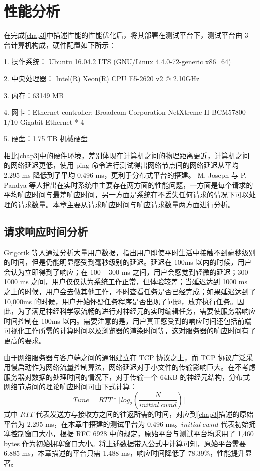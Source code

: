 \chapter{性能分析}

在完成\ref{chap3}中描述性能的性能优化后，将其部署在测试平台下，测试平台由 3 台计算机构成，硬件配置如下所示：

1. 操作系统： Ubuntu 16.04.2 LTS (GNU/Linux 4.4.0-72-generic x86\_64)

2. 中央处理器： Intel(R) Xeon(R) CPU E5-2620 v2 @ 2.10GHz

3. 内存：63149 MB

4. 网卡：Ethernet controller: Broadcom Corporation NetXtreme II BCM57800 1/10 Gigabit Ethernet * 4

5. 硬盘：1.75 TB 机械硬盘

相比\ref{chap3}中的硬件环境，差别体现在计算机之间的物理距离更近，计算机之间的网络延迟更低，使用 ping 命令进行测试得出网络节点间的网络延迟从平均 2.295 ms 降低到了平均 0.496 ms，更利于分布式平台的搭建。
M. Joseph 与 P. Pandya 等人指出在实时系统中主要存在两方面的性能问题，一方面是每个请求的平均响应时间与最差响应时间，另一方面是系统在不丢失任何请求的情况下可以处理的请求数量。本章主要从请求响应时间与响应请求数量两方面进行分析。

\section{请求响应时间分析}
Grigorik 等人通过分析大量用户数据，指出用户即使平时生活中接触不到毫秒级别的时间，但是仍能明显感受到毫秒级别的延迟。延迟在 100ms 以内的时候，用户会认为立即得到了响应；在 100 ~ 300 ms 之间，用户会感觉到轻微的延迟；300 ~ 1000 ms 之间，用户仅仅认为系统工作正常，但体验较差；当延迟达到 1000 ms 之上的时候，用户会去做其他工作，不时查看任务是否已经完成；如果延迟达到了 10,000ms 的时候，用户开始怀疑任务程序是否出现了问题，放弃执行任务。因此，为了满足神经科学家流畅的进行对神经元的实时编辑任务，需要使服务器响应时间控制在 100ms 以内。需要注意的是，用户真正感受到的响应时间还包括前端可视化工作所需的计算时间以及浏览器的渲染时间等，这对服务器的响应时间有了更高的要求。

由于网络服务器与客户端之间的通讯建立在 TCP 协议之上，而 TCP 协议广泛采用慢启动作为网络流量控制算法，网络延迟对于小文件的传输影响巨大。在不考虑服务器对数据的处理时间的情况下，对于传输一个 64KB 的神经元结构，分布式网络节点间的理论响应时间可由下式计算：
$$Time=RTT*\lceil log_2(\frac{N}{initial~cwnd}) \rceil$$
式中 $RTT$ 代表发送方与接收方之间的往返所需的时间，对应到\ref{chap3}描述的原始平台为 2.295 ms，在本章中搭建的测试平台为 0.496 ms。$initial~cwnd$ 代表初始拥塞控制窗口大小，根据 RFC 6928 中的规定，原始平台与测试平台均采用了 1,460 bytes 作为初始拥塞窗口大小。将上述数据带入公式中计算可知，原始平台需要 6.885 ms，本章描述的平台只需 1.488 ms，响应时间降低了 78.39\%，性能提升显著。

